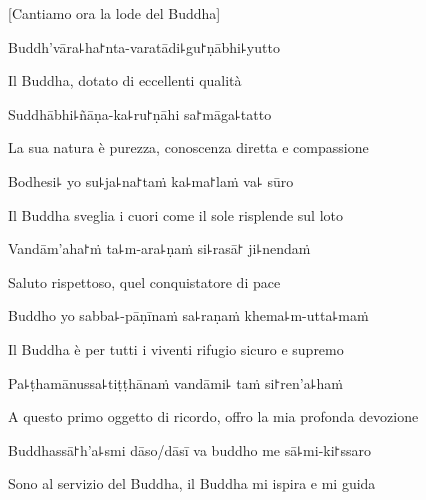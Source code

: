 \begin{english}
[Cantiamo ora la lode del Buddha]
\end{english}

Buddh'vāra꜕ha꜓nta-varatādi꜕gu꜓ṇābhi꜕yutto\\

\begin{english}
Il Buddha, dotato di eccellenti qualità\\
\end{english}

Suddhābhi꜕ñāṇa-ka꜕ru꜓ṇāhi sa꜓māga꜕tatto\\

\begin{english}
La sua natura è purezza, conoscenza diretta e compassione\\
\end{english}

Bodhesi꜕ yo su꜕ja꜕na꜓taṁ ka꜕ma꜓laṁ va꜕ sūro\\

\begin{english}
Il Buddha sveglia i cuori come il sole risplende sul loto \\
\end{english}

Vandām'aha꜓ṁ ta꜕m-ara꜕ṇaṁ si꜕rasā꜓ ji꜕nendaṁ\\
\begin{english}
Saluto rispettoso, quel conquistatore di pace\\
\end{english}

Buddho yo sabba꜕-pāṇīnaṁ sa꜕raṇaṁ khema꜕m-utta꜕maṁ\\

\begin{english}
Il Buddha è per tutti i viventi rifugio sicuro e supremo\\
\end{english}

Pa꜕ṭhamānussa꜕tiṭṭhānaṁ vandāmi꜕ taṁ si꜓ren'a꜕haṁ\\

\begin{english}
A questo primo oggetto di ricordo, offro la mia profonda devozione\\
\end{english}

Buddhassā꜓h'a꜕smi dāso/dāsī va buddho me sā꜕mi-ki꜓ssaro\\

\begin{english}
Sono al servizio del Buddha, il Buddha mi ispira e mi guida\\
\end{english}

